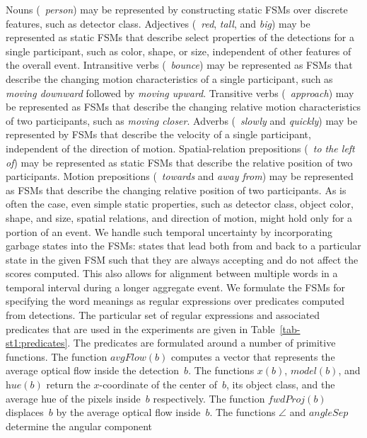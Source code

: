 Nouns (\eg\ \emph{person}) may be represented by constructing static FSMs over
discrete features, such as detector class.
%
Adjectives (\eg\ \emph{red}, \emph{tall}, and \emph{big}) may be represented as
static FSMs that describe select properties of the detections for a single
participant, such as color, shape, or size, independent of other features of
the overall event.
%
Intransitive verbs (\eg\ \emph{bounce}) may be represented as FSMs that
describe the changing motion characteristics of a single participant, such as
\emph{moving downward} followed by \emph{moving upward}.
%
Transitive verbs (\eg\ \emph{approach}) may be represented as FSMs that
describe the changing relative motion characteristics of two participants, such
as \emph{moving closer}.
%
Adverbs (\eg\ \emph{slowly} and \emph{quickly}) may be represented by FSMs that
describe the velocity of a single participant, independent of the direction of
motion.
%
Spatial-relation prepositions (\eg\ \emph{to the left of}) may be represented
as static FSMs that describe the relative position of two participants.
%
Motion prepositions (\eg\ \emph{towards} and \emph{away from}) may be
represented as FSMs that describe the changing relative position of two
participants.
%
As is often the case, even simple static properties, such as detector class,
object color, shape, and size, spatial relations, and direction of motion,
might hold only for a portion of an event.
%
We handle such temporal uncertainty by incorporating garbage states into the
FSMs: states that lead both from and back to a particular state in the given
FSM such that they are always accepting and do not affect the scores computed.
%
This also allows for alignment between multiple words in a temporal interval
during a longer aggregate event.
%
We formulate the FSMs for specifying the word meanings as regular expressions
over predicates computed from detections.
%
The particular set of regular expressions and associated predicates that are
used in the experiments are given in Table~\ref{tab-st1:predicates}.
%
The predicates are formulated around a number of primitive functions.
%
The function $\textit{avgFlow}(b)$ computes a vector that represents the
average optical flow inside the detection~$b$.
%
The functions $x(b)$, $\textit{model}(b)$, and $\textit{hue}(b)$ return the
$x$-coordinate of the center of~$b$, its object class, and the average hue of
the pixels inside~$b$ respectively.
%
The function $\textit{fwdProj}(b)$ displaces~$b$ by the average optical flow
inside~$b$.
%
The functions $\angle$ and $\textit{angleSep}$ determine the angular component
